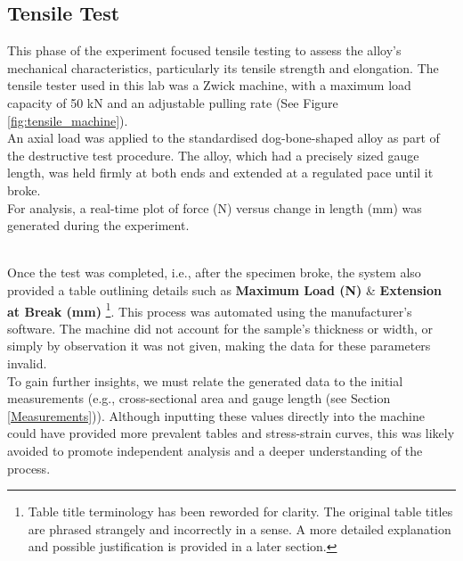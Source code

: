 \documentclass{article}
\begin{document}
\begin{minipage}{0.555\textwidth}
\subsection{Tensile Test}
This phase of the experiment focused tensile testing to assess the alloy's mechanical characteristics, particularly its tensile strength and elongation. The tensile tester used in this lab was a {Zwick machine}, with a maximum load capacity of 50 kN and an adjustable pulling rate (See Figure \ref{fig:tensile_machine}).\\[8pt]
An axial load was applied to the standardised dog-bone-shaped alloy as part of the destructive test procedure. The alloy, which had a precisely sized gauge length, was held firmly at both ends and extended at a regulated pace until it broke.\\[8pt]
For analysis, a real-time plot of force (N) versus change in length (mm) was generated during the experiment.
\end{minipage}\\[8pt]
Once the test was completed, i.e., after the specimen broke, the system also provided a table outlining details such as \textbf{Maximum Load (N)} \& \textbf{Extension at Break (mm)} \footnote{Table title terminology has been reworded for clarity. The original table titles are phrased strangely and incorrectly in a sense. A more detailed explanation and possible justification is provided in a later section.}. This process was automated using the manufacturer's software. The machine did not account for the sample's thickness or width, or simply by observation it was not given, making the data for these parameters invalid.\\[8pt]
To gain further insights, we must relate the generated data to the initial measurements (e.g., cross-sectional area and gauge length (see Section \ref{Measurements})). Although inputting these values directly into the machine could have provided more prevalent tables and stress-strain curves, this was likely avoided to promote independent analysis and a deeper understanding of the process.
\end{document}
